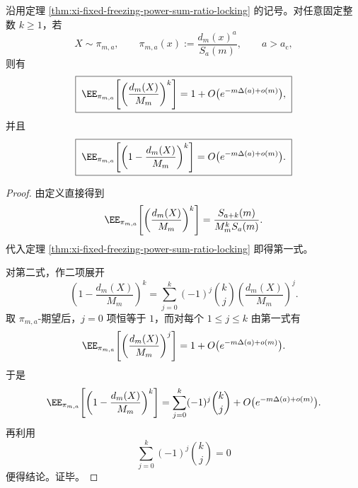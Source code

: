 \begin{corollary}\label{cor:xi-fixed-freezing-escort-positive-moment-collapse}
沿用定理 \ref{thm:xi-fixed-freezing-power-sum-ratio-locking} 的记号。对任意固定整数 \(k\ge 1\)，若
\[
X\sim \pi_{m,a},
\qquad
\pi_{m,a}(x):=\frac{d_m(x)^a}{S_a(m)},
\qquad
a>a_{\mathrm c},
\]
则有
\[
\boxed{\;
\EE_{\pi_{m,a}}\!\left[\left(\frac{d_m(X)}{M_m}\right)^k\right]
=
1+O\bigl(e^{-m\Delta(a)+o(m)}\bigr),\;}
\]
并且
\[
\boxed{\;
\EE_{\pi_{m,a}}\!\left[\left(1-\frac{d_m(X)}{M_m}\right)^k\right]
=
O\bigl(e^{-m\Delta(a)+o(m)}\bigr).\;}
\]
\end{corollary}
\begin{proof}
由定义直接得到
\[
\EE_{\pi_{m,a}}\!\left[\left(\frac{d_m(X)}{M_m}\right)^k\right]
=
\frac{S_{a+k}(m)}{M_m^kS_a(m)}.
\]
代入定理 \ref{thm:xi-fixed-freezing-power-sum-ratio-locking} 即得第一式。

对第二式，作二项展开
\[
\left(1-\frac{d_m(X)}{M_m}\right)^k
=
\sum_{j=0}^{k}(-1)^j\binom{k}{j}\left(\frac{d_m(X)}{M_m}\right)^j.
\]
取 \(\pi_{m,a}\)-期望后，\(j=0\) 项恒等于 \(1\)，而对每个 \(1\le j\le k\) 由第一式有
\[
\EE_{\pi_{m,a}}\!\left[\left(\frac{d_m(X)}{M_m}\right)^j\right]
=
1+O\bigl(e^{-m\Delta(a)+o(m)}\bigr).
\]
于是
\[
\EE_{\pi_{m,a}}\!\left[\left(1-\frac{d_m(X)}{M_m}\right)^k\right]
=
\sum_{j=0}^{k}(-1)^j\binom{k}{j}
+O\bigl(e^{-m\Delta(a)+o(m)}\bigr).
\]
再利用
\[
\sum_{j=0}^{k}(-1)^j\binom{k}{j}=0
\]
便得结论。证毕。
\end{proof}


